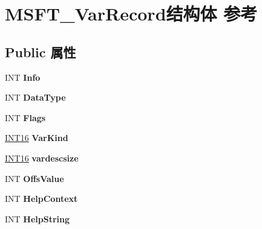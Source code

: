 \hypertarget{struct_m_s_f_t___var_record}{}\section{M\+S\+F\+T\+\_\+\+Var\+Record结构体 参考}
\label{struct_m_s_f_t___var_record}
\subsection*{Public 属性}
\begin{DoxyCompactItemize}
\item 
\mbox{\label{struct_m_s_f_t___var_record_a1e2b2854948b97b1af485876058aabef}} 
I\+NT {\bfseries Info}
\item 
\mbox{\label{struct_m_s_f_t___var_record_a7fbeaa9c8a12b0de0ef6152b4ebbf939}} 
I\+NT {\bfseries Data\+Type}
\item 
\mbox{\label{struct_m_s_f_t___var_record_a1c744b4f327b85eee3ad98c7e44090ff}} 
I\+NT {\bfseries Flags}
\item 
\mbox{\label{struct_m_s_f_t___var_record_a7d243eb79ae0c78a539220583046c5a4}} 
\hyperlink{_processor_bind_8h_a30f500129d8c688af07726d5d34ce52d}{I\+N\+T16} {\bfseries Var\+Kind}
\item 
\mbox{\label{struct_m_s_f_t___var_record_a751e1981dfc7c3dcb377c83368d433a2}} 
\hyperlink{_processor_bind_8h_a30f500129d8c688af07726d5d34ce52d}{I\+N\+T16} {\bfseries vardescsize}
\item 
\mbox{\label{struct_m_s_f_t___var_record_acd0d85788a719fe28b18bd1818dda8fe}} 
I\+NT {\bfseries Offs\+Value}
\item 
\mbox{\label{struct_m_s_f_t___var_record_a11c76de6180653fa6689b7851460a28b}} 
I\+NT {\bfseries Help\+Context}
\item 
\mbox{\label{struct_m_s_f_t___var_record_a43bc973c0c66e889a4f5ee8ca39d6566}} 
I\+NT {\bfseries Help\+String}
\item 

\end{DoxyCompactItemize}
